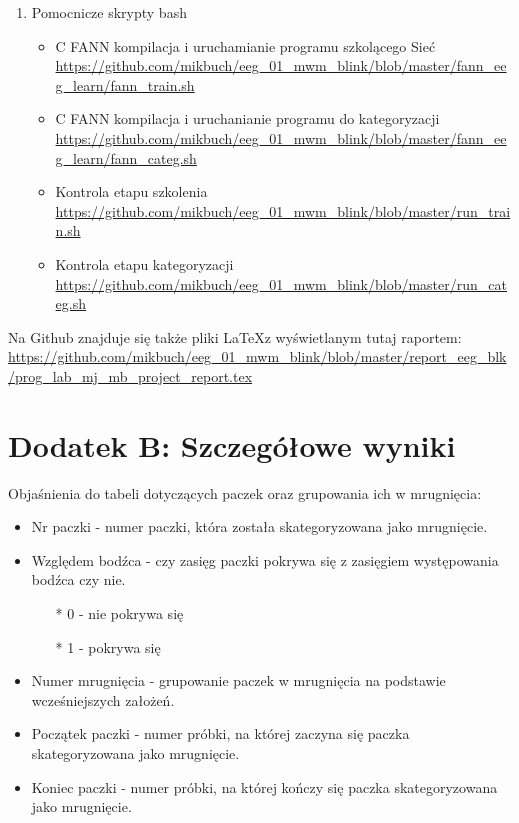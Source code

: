 \documentclass{article}
\begin{document}
\begin{enumerate}
            \item{Pomocnicze skrypty bash}
                \begin{itemize}
                    \item{C FANN kompilacja i uruchamianie programu szkolącego Sieć} \\
                        \url{https://github.com/mikbuch/eeg\_01\_mwm\_blink/blob/master/fann\_eeg\_learn/fann\_train.sh}
                    \item{C FANN kompilacja i uruchanianie programu do kategoryzacji} \\
                        \url{https://github.com/mikbuch/eeg\_01\_mwm\_blink/blob/master/fann\_eeg\_learn/fann\_categ.sh}
                    \item{Kontrola etapu szkolenia} \\
                        \url{https://github.com/mikbuch/eeg\_01\_mwm\_blink/blob/master/run\_train.sh}
                    \item{Kontrola etapu kategoryzacji} \\
                        \url{https://github.com/mikbuch/eeg\_01\_mwm\_blink/blob/master/run\_categ.sh}
                \end{itemize}
        \end{enumerate}

        Na Github znajduje się także pliki \LaTeX z wyświetlanym tutaj raportem:
            \url{https://github.com/mikbuch/eeg\_01\_mwm\_blink/blob/master/report\_eeg\_blk/prog\_lab\_mj\_mb\_project\_report.tex}

    \newpage
    \section*{Dodatek B: Szczegółowe wyniki}
        Objaśnienia do tabeli dotyczących paczek oraz grupowania ich w mrugnięcia: 
        \begin{itemize}
            \item Nr paczki - numer paczki, która została skategoryzowana jako mrugnięcie.
            \item Względem bodźca - czy zasięg paczki pokrywa się z zasięgiem występowania bodźca czy nie. 
            \begin{itemize}
                \item[*] 0 - nie pokrywa się\
                \item[*] 1 - pokrywa się\
            \end{itemize}
            \item Numer mrugnięcia - grupowanie paczek w mrugnięcia na podstawie wcześniejszych założeń.
            \item Początek paczki - numer próbki, na której zaczyna się paczka skategoryzowana jako mrugnięcie.
            \item Koniec paczki - numer próbki, na której kończy się paczka skategoryzowana jako mrugnięcie. 
        \end{itemize}
\end{document}
